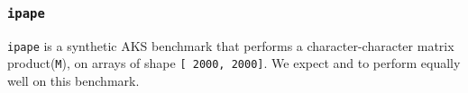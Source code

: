 \subsubsection{\tt ipape}
\label{benchmarkipape}

{\tt ipape} is a synthetic AKS benchmark that performs
a character-character matrix product({\tt \qM\qand\qdot\qeq\qtran\0M}), 
on arrays of shape {\tt [ 2000, 2000]}.
We expect \wlf and \awlf to perform equally well on this
benchmark.
